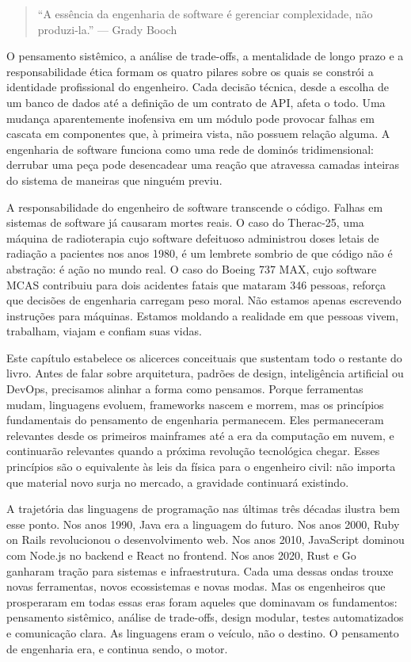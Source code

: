 \begin{quote}
``A essência da engenharia de software é gerenciar complexidade, não
produzi-la.'' --- Grady Booch
\end{quote}

O pensamento sistêmico, a análise de trade-offs, a mentalidade de longo
prazo e a responsabilidade ética formam os quatro pilares sobre os quais
se constrói a identidade profissional do engenheiro. Cada decisão técnica,
desde a escolha de um banco de dados até a definição de um contrato
de API, afeta o todo. Uma mudança aparentemente inofensiva em um módulo
pode provocar falhas em cascata em componentes que, à primeira vista, não
possuem relação alguma. A engenharia de software funciona como uma rede de
dominós tridimensional: derrubar uma peça pode desencadear uma reação que
atravessa camadas inteiras do sistema de maneiras que ninguém previu.

A responsabilidade do engenheiro de software transcende o código. Falhas
em sistemas de software já causaram mortes reais. O caso do Therac-25,
uma máquina de radioterapia cujo software defeituoso administrou doses
letais de radiação a pacientes nos anos 1980, é um lembrete sombrio de
que código não é abstração: é ação no mundo real. O caso do Boeing
737 MAX, cujo software MCAS contribuiu para dois acidentes fatais que
mataram 346 pessoas, reforça que decisões de engenharia carregam peso
moral. Não estamos apenas escrevendo instruções para máquinas. Estamos
moldando a realidade em que pessoas vivem, trabalham, viajam e confiam
suas vidas.

Este capítulo estabelece os alicerces conceituais que sustentam todo o
restante do livro. Antes de falar sobre arquitetura, padrões de design,
inteligência artificial ou DevOps, precisamos alinhar a forma como
pensamos. Porque ferramentas mudam, linguagens evoluem, frameworks
nascem e morrem, mas os princípios fundamentais do pensamento de
engenharia permanecem. Eles permaneceram relevantes desde os primeiros
mainframes até a era da computação em nuvem, e continuarão relevantes
quando a próxima revolução tecnológica chegar. Esses princípios são o
equivalente às leis da física para o engenheiro civil: não importa que
material novo surja no mercado, a gravidade continuará existindo.

A trajetória das linguagens de programação nas últimas três
décadas ilustra bem esse ponto. Nos anos 1990, Java era a linguagem do
futuro. Nos anos 2000, Ruby on Rails revolucionou o desenvolvimento web.
Nos anos 2010, JavaScript dominou com Node.js no backend e React no
frontend. Nos anos 2020, Rust e Go ganharam tração para sistemas e
infraestrutura. Cada uma dessas ondas trouxe novas ferramentas, novos
ecossistemas e novas modas. Mas os engenheiros que prosperaram em todas
essas eras foram aqueles que dominavam os fundamentos: pensamento
sistêmico, análise de trade-offs, design modular, testes automatizados
e comunicação clara. As linguagens eram o veículo, não o destino. O
pensamento de engenharia era, e continua sendo, o motor.

